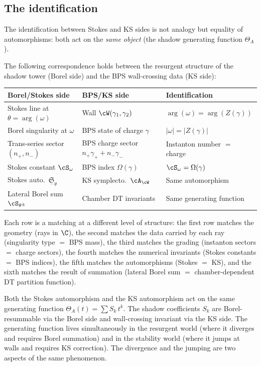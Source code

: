 \subsection{The identification}
\label{subsec:stokes-wc-identification}
%

The identification between Stokes and KS sides is not analogy but equality of automorphisms: both act on the \emph{same object} (the shadow generating function $\Theta_A$).

\begin{theorem}
\label{thm:six-fold-correspondence}
The following correspondence holds between the resurgent structure of the shadow tower \textup{(}Borel side\textup{)} and the BPS wall-crossing data \textup{(}KS side\textup{)}:
\begin{center}
\renewcommand{\arraystretch}{1.3}
\begin{tabular}{@{}lll@{}}
\toprule
\textbf{Borel/Stokes side} & \textbf{BPS/KS side} & \textbf{Identification} \\
\midrule
Stokes line at $\theta = \arg(\omega)$ & Wall $\cW(\gamma_1, \gamma_2)$ & $\arg(\omega) = \arg(Z(\gamma))$ \\
Borel singularity at $\omega$ & BPS state of charge $\gamma$ & $|\omega| = |Z(\gamma)|$ \\
Trans-series sector $(n_+, n_-)$ & BPS charge sector $n_+ \gamma_+ + n_- \gamma_-$ & Instanton number $=$ charge \\
Stokes constant $\cS_\omega$ & BPS index $\Omega(\gamma)$ & $\cS_\omega = \Omega(\gamma)$ \\
Stokes auto.\ $\underline{\mathfrak{S}}_\theta$ & KS symplecto.\ $\cA_\cW$ & Same automorphism \\
Lateral Borel sum $\cS_{\theta^\pm}$ & Chamber DT invariants & Same generating function \\
\bottomrule
\end{tabular}
\end{center}
Each row is a matching at a different level of structure: the first row matches the geometry \textup{(}rays in $\C$\textup{)}, the second matches the data carried by each ray \textup{(}singularity type $=$ BPS mass\textup{)}, the third matches the grading \textup{(}instanton sectors $=$ charge sectors\textup{)}, the fourth matches the numerical invariants \textup{(}Stokes constants $=$ BPS indices\textup{)}, the fifth matches the automorphisms \textup{(}Stokes $=$ KS\textup{)}, and the sixth matches the result of summation \textup{(}lateral Borel sum $=$ chamber-dependent DT partition function\textup{)}.

\medskip\noindent Both the Stokes automorphism and the KS automorphism act on the same generating function $\Theta_A(t) = \sum S_k\, t^k$. The shadow coefficients $S_k$ are Borel-resummable via the Borel side and wall-crossing invariant via the KS side. The generating function lives simultaneously in the resurgent world \textup{(}where it diverges and requires Borel summation\textup{)} and in the stability world \textup{(}where it jumps at walls and requires KS correction\textup{)}. The divergence and the jumping are two aspects of the same phenomenon.
\end{theorem}

